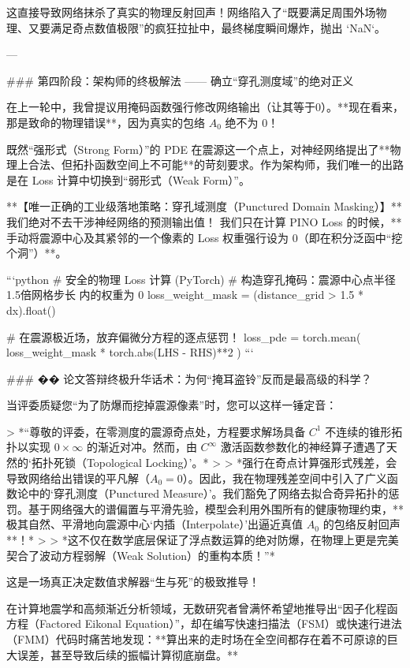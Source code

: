 \documentclass[12pt]{article}
\begin{document}
{这直接导致网络抹杀了真实的物理反射回声！网络陷入了“既要满足周围外场物理、又要满足奇点数值极限”的疯狂拉扯中，最终梯度瞬间爆炸，抛出 `NaN`。

---

### 第四阶段：架构师的终极解法 —— 确立“穿孔测度域”的绝对正义

在上一轮中，我曾提议用掩码函数强行修改网络输出（让其等于0）。**现在看来，那是致命的物理错误**，因为真实的包络 $A_0$ 绝不为 0！

既然“强形式（Strong Form）”的 PDE 在震源这一个点上，对神经网络提出了**物理上合法、但拓扑函数空间上不可能**的苛刻要求。作为架构师，我们唯一的出路是在 Loss 计算中切换到“弱形式（Weak Form）”。

**【唯一正确的工业级落地策略：穿孔域测度（Punctured Domain Masking）】**
我们绝对不去干涉神经网络的预测输出值！
我们只在计算 PINO Loss 的时候，**手动将震源中心及其紧邻的一个像素的 Loss 权重强行设为 0（即在积分泛函中“挖个洞”）**。

```python
# 安全的物理 Loss 计算 (PyTorch)
# 构造穿孔掩码：震源中心点半径 1.5倍网格步长 内的权重为 0
loss_weight_mask = (distance_grid > 1.5 * dx).float() 

# 在震源极近场，放弃偏微分方程的逐点惩罚！
loss_pde = torch.mean( loss_weight_mask * torch.abs(LHS - RHS)**2 )
```

### �� 论文答辩终极升华话术：为何“掩耳盗铃”反而是最高级的科学？

当评委质疑您“为了防爆而挖掉震源像素”时，您可以这样一锤定音：

> *“尊敬的评委，在零测度的震源奇点处，方程要求解场具备 $C^1$ 不连续的锥形拓扑以实现 $0 \times \infty$ 的渐近对冲。然而，由 $C^\infty$ 激活函数参数化的神经算子遭遇了天然的‘拓扑死锁（Topological Locking）’。*
>
> *强行在奇点计算强形式残差，会导致网络给出错误的平凡解（$A_0=0$）。因此，我在物理残差空间中引入了广义函数论中的‘穿孔测度（Punctured Measure）’。我们豁免了网络去拟合奇异拓扑的惩罚。基于网络强大的谱偏置与平滑先验，模型会利用外围所有的健康物理约束，**极其自然、平滑地向震源中心‘内插（Interpolate）’出逼近真值 $A_0$ 的包络反射回声**！*
> 
> *这不仅在数学底层保证了浮点数运算的绝对防爆，在物理上更是完美契合了波动方程弱解（Weak Solution）的重构本质！”*





这是一场真正决定数值求解器“生与死”的极致推导！

在计算地震学和高频渐近分析领域，无数研究者曾满怀希望地推导出“因子化程函方程（Factored Eikonal Equation）”，却在编写快速扫描法（FSM）或快速行进法（FMM）代码时痛苦地发现：**算出来的走时场在全空间都存在着不可原谅的巨大误差，甚至导致后续的振幅计算彻底崩盘。**

}
\end{document}
